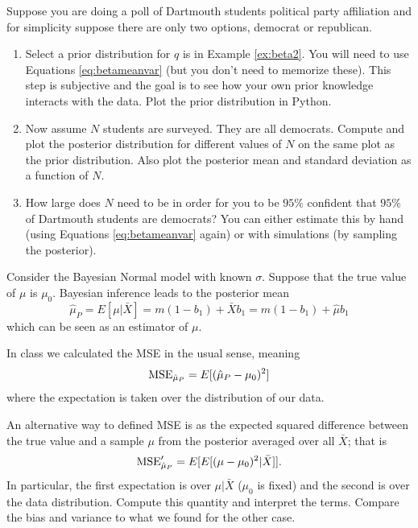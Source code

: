 \newpage

\begin{exercise}
 Suppose you are doing a poll of Dartmouth students political party affiliation and for simplicity suppose there are only two options, democrat or republican.  
\begin{enumerate}[label=(\alph*)]
\item Select a prior distribution for $q$ is in Example \ref{ex:beta2}. You will need to use Equations \ref{eq:betameanvar} (but you don't need to memorize these). This step is subjective and the goal is to see how your own prior knowledge interacts with the data. Plot the prior distribution in Python. 
\item Now assume $N$ students are surveyed. They are all democrats. Compute and plot the posterior distribution for different values of $N$ on the same plot as the prior distribution. Also plot the posterior mean and standard deviation as a function of $N$.
\item How large does $N$ need to be in order for you to be $95\%$ confident that $95\%$ of Dartmouth students are democrats? You can either estimate this by hand (using Equations \ref{eq:betameanvar} again) or with simulations (by sampling the posterior). 
\end{enumerate}
\end{exercise}

\begin{exercise}
Consider the Bayesian Normal model with known $\sigma$. Suppose that the true value of $\mu$ is $\mu_0$. Bayesian inference leads to the posterior mean 
\begin{equation}
\hat{\mu}_P = E[\mu|\bar{X}] =  m(1-b_1) +\bar{X} b_1= m(1-b_1) +\hat{\mu}b_1
\end{equation}
which can be seen as an estimator of $\mu$. 

In class we calculated the MSE in the usual sense, meaning 
\begin{equation}
{\rm MSE}_{\hat{\mu}_P} = E[(\hat{\mu}_P- \mu_0)^2]
\end{equation}
where the expectation is taken over the distribution of our data. 

An alternative way to defined MSE is as the expected squared difference between the true value and a sample $\mu$ from the posterior averaged over all $\bar{X}$; that is
\begin{equation}
{\rm MSE}_{\hat{\mu}_P}' = E[E[(\mu- \mu_0)^2|\bar{X}]]. 
\end{equation}
In particular, the first expectation is over $\mu|\bar{X}$ ($\mu_0$ is fixed) and the second is over the data distribution. 
Compute this quantity and interpret the terms. Compare the bias and variance to what we found for the other case. 

\end{exercise}


